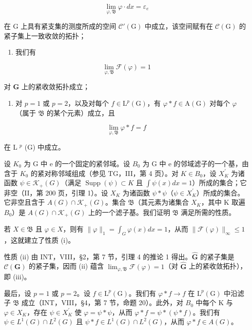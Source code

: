 \[
\lim _ {\varphi , \mathfrak {B}} \varphi \cdot d x = \varepsilon_ {e}
\]

在 G 上具有紧支集的测度所成的空间 \(\mathcal{C}'(\mathrm{G})\) 中成立，该空间赋有在 \(\mathcal{C}(\mathrm{G})\) 的紧子集上一致收敛的拓扑；

\begin{enumerate}
\def\labelenumi{(\roman{enumi})}
\setcounter{enumi}{2}
\tightlist
\item
  我们有
\end{enumerate}

\[
\lim _ {\varphi , \mathfrak {B}} \mathcal {F} (\varphi) = 1
\]

对 \(\widehat{\mathbf{G}}\) 上的紧收敛拓扑成立；

\begin{enumerate}
\def\labelenumi{(\roman{enumi})}
\setcounter{enumi}{3}
\tightlist
\item
  对 \(p = 1\) 或 \(p = 2\)，以及对每个 \(f \in \mathrm{L}^p(\mathrm{G})\)，有 \(\varphi * f \in \mathrm{A}(\mathrm{G})\) 对每个 \(\varphi\)（属于 \(\mathfrak{B}\) 的某个元素）成立，且
\end{enumerate}

\[
\lim _ {\varphi , \mathfrak {B}} \varphi * f = f
\]

在 L \(^{p}\) (G) 中成立。

设 \(K_{0}\) 为 G 中 e 的一个固定的紧邻域。设 \(B_{0}\) 为 G 中 e 的邻域滤子的一个基，由含于 \(K_{0}\) 的紧对称邻域组成（参见 TG，III，第 4 页）。对 \(K \in B_{0}\)，设 \(X_{K}^{\prime}\) 为诸函数 \(\psi \in \mathcal{K}_{+}(G)\)（满足 \(\operatorname{Supp}(\psi) \subset K\) 且 \(\int \psi(x)dx = 1\)）所成的集合；它非空（II，第 200 页，引理 1）。设 \(X_{K}\) 为诸函数 \(\psi * \psi\)（\(\psi \in X_{K}^{\prime}\)）所成的集合。它非空且含于 \(A(G) \cap \mathcal{K}_{+}(G)\)。集合 \(\mathfrak{B}\)（其元素为诸集合 \(X_{K}\)，其中 K 取遍 \(B_{0}\)）是 \(A(G) \cap \mathcal{K}_{+}(G)\) 上的一个滤子基。我们证明 \(\mathfrak{B}\) 满足所需的性质。

若 \(X \in \mathfrak{B}\) 且 \(\varphi \in X\)，则有 \(\| \varphi \|_1 = \int_{G} \varphi(x) dx = 1\)，从而 \(\| \mathcal{F}(\varphi) \|_\infty \leqslant 1\)，这就建立了性质 (i)。

性质 (ii) 由 INT，VIII，§2，第 7 节，引理 4 的推论 1 得出。\(\widehat{\mathbf{G}}\) 的紧子集是 \(\mathcal{C}(\mathbf{G})\) 的紧子集，因而 (ii) 蕴含 \(\lim_{\varphi, \mathfrak{B}} \mathcal{F}(\varphi) = 1\)（对 \(\widehat{\mathbf{G}}\) 上的紧收敛拓扑），即 (iii)。

最后，设 \(p=1\) 或 \(p=2\)。设 \(f\in\mathrm{L}^{p}(\mathrm{G})\)。我们有 \(\varphi*f\to f\) 在 \(\mathrm{L}^{p}(\mathrm{G})\) 中沿滤子 \(\mathfrak{B}\) 成立（INT，VIII，§4，第 7 节，命题 20）。此外，对 \(B_{0}\) 中每个 K 与 \(\varphi\in X_{K}\)，存在 \(\psi\in X_{K}^{\prime}\) 使 \(\varphi=\psi*\psi\)，从而 \(\varphi*f=\psi*(\psi*f)\)。我们有 \(\psi\in L^{1}(G)\cap L^{2}(G)\) 且 \(\psi*f\in L^{1}(G)\cap L^{2}(G)\)，从而 \(\varphi*f\in A(G)\)。

